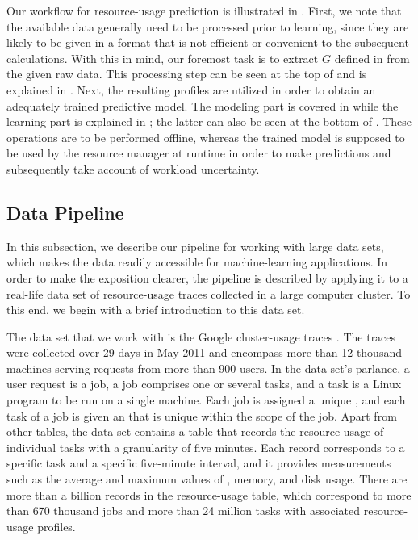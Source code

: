 Our workflow for resource-usage prediction is illustrated in
. First, we note that the available data generally need to
be processed prior to learning, since they are likely to be given in a format
that is not efficient or convenient to the subsequent calculations. With this in
mind, our foremost task is to extract $G$ defined in  from
the given raw data. This processing step can be seen at the top of
 and is explained in . Next, the
resulting profiles are utilized in order to obtain an adequately trained
predictive model. The modeling part is covered in 
while the learning part is explained in ; the
latter can also be seen at the bottom of . These operations
are to be performed offline, whereas the trained model is supposed to be used by
the resource manager at runtime in order to make predictions and subsequently
take account of workload uncertainty.

\subsection{Data Pipeline}

In this subsection, we describe our pipeline for working with large data sets,
which makes the data readily accessible for machine-learning applications. In
order to make the exposition clearer, the pipeline is described by applying it
to a real-life data set of resource-usage traces collected in a large computer
cluster. To this end, we begin with a brief introduction to this data set.

The data set that we work with is the Google cluster-usage traces
\cite{reiss2011}. The traces were collected over 29 days in May 2011 and
encompass more than 12 thousand machines serving requests from more than 900
users. In the data set's parlance, a user request is a job, a job comprises one
or several tasks, and a task is a Linux program to be run on a single machine.
Each job is assigned a unique , and each task of a job is given an
 that is unique within the scope of the job. Apart from other tables, the
data set contains a table that records the resource usage of individual tasks
with a granularity of five minutes. Each record corresponds to a specific task
and a specific five-minute interval, and it provides measurements such as the
average and maximum values of , memory, and disk usage. There are more
than a billion records in the resource-usage table, which correspond to more
than 670 thousand jobs and more than 24 million tasks with associated
resource-usage profiles.

